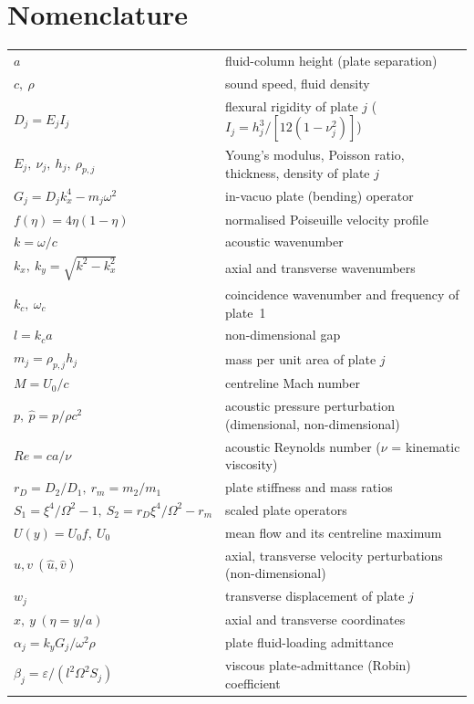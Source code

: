 \documentclass[11pt]{article}
\begin{document}
\section*{Nomenclature}
\noindent\begin{tabular}{@{}l@{\hspace{1em}}p{}@{}}
$a$ & fluid-column height (plate separation)\\
$c,\ \rho$ & sound speed, fluid density\\
$D_j=E_jI_j$ & flexural rigidity of plate $j$ ($I_j=h_j^3/[12(1-\nu_j^2)]$)\\
$E_j,\ \nu_j,\ h_j,\ \rho_{p,j}$ & Young's modulus, Poisson ratio, thickness, density of plate $j$\\
$G_j=D_jk_x^4-m_j\omega^2$ & in-vacuo plate (bending) operator\\
$f(\eta)=4\eta(1-\eta)$ & normalised Poiseuille velocity profile\\
$k=\omega/c$ & acoustic wavenumber\\
$k_x,\ k_y=\sqrt{k^2-k_x^2}$ & axial and transverse wavenumbers\\
$k_c,\ \omega_c$ & coincidence wavenumber and frequency of plate~1\\
$l=k_ca$ & non-dimensional gap\\
$m_j=\rho_{p,j}h_j$ & mass per unit area of plate $j$\\
$M=U_0/c$ & centreline Mach number\\
$p,\ \hat p=p/\rho c^2$ & acoustic pressure perturbation (dimensional, non-dimensional)\\
$Re=ca/\nu$ & acoustic Reynolds number ($\nu$ = kinematic viscosity)\\
$r_D=D_2/D_1,\ r_m=m_2/m_1$ & plate stiffness and mass ratios\\
$S_1=\xi^4/\Omega^2-1,\ S_2=r_D\xi^4/\Omega^2-r_m$ & scaled plate operators\\
$U(y)=U_0f,\ U_0$ & mean flow and its centreline maximum\\
$u,v\ (\hat u,\hat v)$ & axial, transverse velocity perturbations (non-dimensional)\\
$w_j$ & transverse displacement of plate $j$\\
$x,\ y\ (\eta=y/a)$ & axial and transverse coordinates\\
$\alpha_j=k_yG_j/\omega^2\rho$ & plate fluid-loading admittance\\
$\beta_j=\varepsilon/(l^2\Omega^2S_j)$ & viscous plate-admittance (Robin) coefficient\\

\end{tabular}
\end{document}
